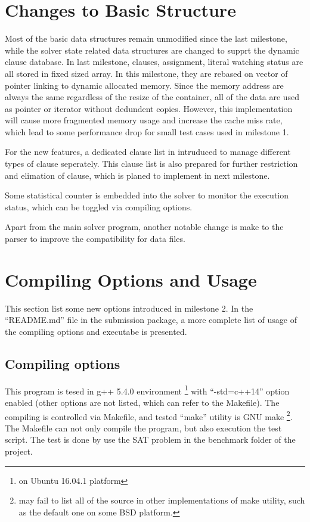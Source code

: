 \documentclass[a4paper, 11.5pt]{article}
\begin{document}
\begin{multicols}{2}
  \section{Changes to Basic Structure}
    Most of the basic data structures remain unmodified since the last milestone, while the solver 
    state related data structures are changed to supprt the dynamic clause database. In last milestone, 
    clauses, assignment, literal watching status are all stored in fixed sized array. In this milestone,
    they are rebased on vector of pointer linking to dynamic allocated memory. Since the memory address are
    always the same regardless of the resize of the container, all of the data are used as pointer
    or iterator without dedundent copies. However, this implementation will cause more fragmented memory
    usage and increase the cache miss rate, which lead to some performance drop for small test cases used in
    milestone 1. 

    For the new features, a dedicated clause list in intruduced to manage different types of 
    clause seperately. This clause list is also prepared for further restriction and elimation of clause,
    which is planed to implement in next milestone.

    Some statistical counter is embedded into the solver to monitor the execution status, which can be toggled 
    via compiling options.

    Apart from the main solver program, another notable change is make to the parser to improve the compatibility for 
    data files.

  \section{Compiling Options and Usage}

    This section list some new options introduced in milestone 2.
    In the ``README.md'' file in the submission package, a more complete list of usage of the
    compiling options and executabe is presented.

    \subsection{Compiling options}

    This program is tesed in g++ 5.4.0 environment \footnote{on Ubuntu 16.04.1 platform} with ``-std=c++14'' option enabled (other options are not listed, which can refer to the Makefile).
    The compiling is controlled via Makefile, and tested ``make'' utility is GNU make
    \footnote{may fail to list all of the source in other implementations of make utility, such as the default one on some BSD platform.}.
    The Makefile can not only compile the program, but also execution the test script. The test is 
    done by use the SAT problem in the benchmark folder of the project. 


\end{multicols}
\end{document}
